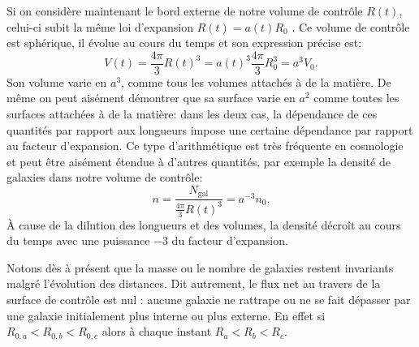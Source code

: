 Si on considère maintenant le bord externe de notre volume de contrôle $R(t)$, celui-ci subit la même loi d'expansion $R(t)=a(t)R_0$ . Ce volume de contrôle est sphérique, il évolue au cours du temps et son expression précise est:
\begin{equation}
V(t)=\frac{4\pi}{3} R(t)^3 = a(t)^3\frac{4\pi}{3} R_0^3= a^3 V_0.
\end{equation}
Son volume varie en $a^3$, comme tous les volumes attachés à de la matière. De même on peut aisément démontrer que sa surface varie en $a^2$ comme toutes les surfaces attachées à de la matière: dans les deux cas, la dépendance de ces quantités par rapport aux longueurs impose une certaine dépendance par rapport au facteur d'expansion. Ce type d'arithmétique est très fréquente en cosmologie et peut être aisément étendue à d'autres quantités, par exemple la densité de galaxies dans notre volume de contrôle:
\begin{equation}
n=\frac{N_\mathrm{gal}}{\frac{4\pi}{3} R(t)^3}=a^{-3} n_0.
\end{equation}
À cause de la dilution des longueurs et des volumes, la densité décroît au cours du temps avec une puissance $-3$ du facteur d'expansion. 

Notons dès à présent que la masse ou le nombre de galaxies restent invariants malgré l'évolution des distances. Dit autrement, le flux net au travers de la surface de contrôle est nul : aucune galaxie ne rattrape ou ne se fait dépasser par une galaxie initialement plus interne ou plus externe. En effet si $R_{0,a}<R_{0,b}<R_{0,c}$ alors à chaque instant $R_a<R_b<R_c$.

